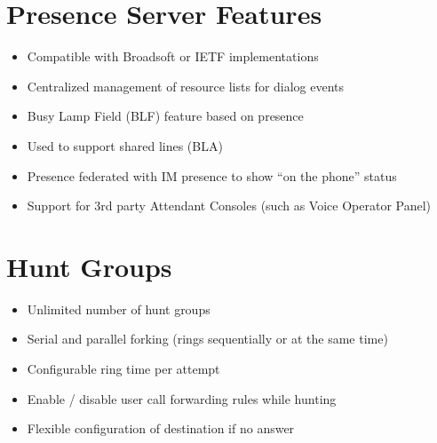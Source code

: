 \documentclass[letterpaper,10pt,english]{sphinxmanual}
\begin{document}
\section{Presence Server Features}
\label{\detokenize{features:presence-server-features}}\begin{itemize}
\item {} 
Compatible with Broadsoft or IETF implementations

\item {} 
Centralized management of resource lists for dialog events

\item {} 
Busy Lamp Field (BLF) feature based on presence

\item {} 
Used to support shared lines (BLA)

\item {} 
Presence federated with IM presence to show “on the phone” status

\item {} 
Support for 3rd party Attendant Consoles (such as Voice Operator Panel)

\end{itemize}


\section{Hunt Groups}
\label{\detokenize{features:hunt-groups}}\begin{itemize}
\item {} 
Unlimited number of hunt groups

\item {} 
Serial and parallel forking (rings sequentially or at the same time)

\item {} 
Configurable ring time per attempt

\item {} 
Enable / disable user call forwarding rules while hunting

\item {} 
Flexible configuration of destination if no answer

\end{itemize}
\end{document}
